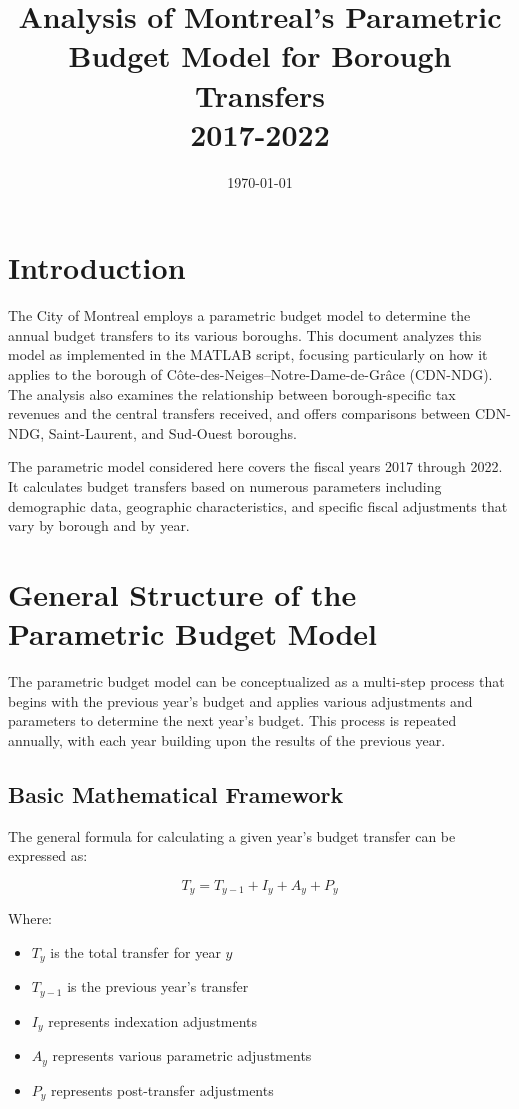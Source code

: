 \documentclass{article}
\title{Analysis of Montreal's Parametric Budget Model for Borough Transfers\\
\large 2017-2022}
\author{}
\date{\today}
\begin{document}
\maketitle

\tableofcontents

\section{Introduction}

The City of Montreal employs a parametric budget model to determine the annual budget transfers to its various boroughs. This document analyzes this model as implemented in the MATLAB script, focusing particularly on how it applies to the borough of Côte-des-Neiges–Notre-Dame-de-Grâce (CDN-NDG). The analysis also examines the relationship between borough-specific tax revenues and the central transfers received, and offers comparisons between CDN-NDG, Saint-Laurent, and Sud-Ouest boroughs.

The parametric model considered here covers the fiscal years 2017 through 2022. It calculates budget transfers based on numerous parameters including demographic data, geographic characteristics, and specific fiscal adjustments that vary by borough and by year.

\section{General Structure of the Parametric Budget Model}

The parametric budget model can be conceptualized as a multi-step process that begins with the previous year's budget and applies various adjustments and parameters to determine the next year's budget. This process is repeated annually, with each year building upon the results of the previous year.

\subsection{Basic Mathematical Framework}

The general formula for calculating a given year's budget transfer can be expressed as:

\begin{equation}
T_y = T_{y-1} + I_y + A_y + P_y
\end{equation}

Where:
\begin{itemize}
    \item $T_y$ is the total transfer for year $y$
    \item $T_{y-1}$ is the previous year's transfer
    \item $I_y$ represents indexation adjustments
    \item $A_y$ represents various parametric adjustments
    \item $P_y$ represents post-transfer adjustments
\end{itemize}
\end{document}
